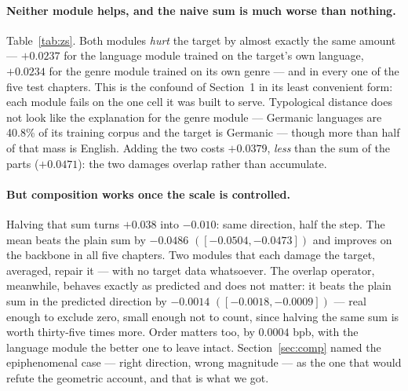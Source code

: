\documentclass[10pt,twocolumn,a4paper]{article}
\begin{document}
\paragraph{Neither module helps, and the naive sum is much worse than nothing.}
Table~\ref{tab:zs}. Both modules \emph{hurt} the target by almost exactly the
same amount --- $+0.0237$ for the language module trained on the target's own
language, $+0.0234$ for the genre module trained on its own genre --- and in
every one of the five test chapters. This is the confound of Section~1 in its
least convenient form: each module fails on the one cell it was built to serve.
Typological distance does not look like the explanation for the genre module ---
Germanic languages are 40.8\% of its training corpus and the target is Germanic
--- though more than half of that mass is English. Adding the two costs
$+0.0379$, \emph{less} than the sum of the parts ($+0.0471$): the two damages
overlap rather than accumulate.

\paragraph{But composition works once the scale is controlled.} Halving that sum
turns $+0.038$ into $-0.010$: same direction, half the step. The mean beats the
plain sum by $-0.0486$ $([-0.0504,-0.0473])$ and improves on the backbone in all
five chapters. Two modules that each damage the target, averaged, repair it ---
with no target data whatsoever. The overlap operator, meanwhile, behaves exactly
as predicted and does not matter: it beats the plain sum in the predicted
direction by $-0.0014$ $([-0.0018,-0.0009])$ --- real enough to exclude zero,
small enough not to count, since halving the same sum is worth thirty-five times
more. Order matters too, by $0.0004$ bpb, with the language module the better
one to leave intact. Section~\ref{sec:comp} named the epiphenomenal case ---
right direction, wrong magnitude --- as the one that would refute the geometric
account, and that is what we got.
\end{document}
